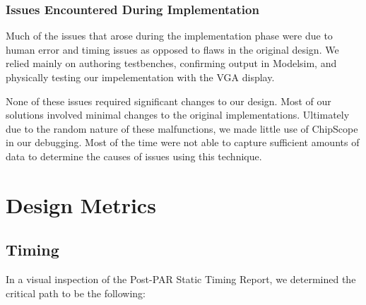 \subsubsection{Issues Encountered During Implementation}

Much of the issues that arose during the implementation phase were due to 
human error and timing issues as opposed to flaws in the original design. We relied
mainly on authoring testbenches, confirming output in Modelsim, and physically 
testing our impelementation with the VGA display.

None of these issues required significant changes to our design. Most of our solutions
involved minimal changes to the original implementations. Ultimately 
due to the random nature of these malfunctions, we made little use of ChipScope in our
debugging. Most of the time were not able to capture sufficient amounts of 
data to determine the causes of issues using this technique.

\section{Design Metrics}

\subsection{Timing}

In a visual inspection of the Post-PAR Static Timing Report, we determined the critical path to be
the following:

